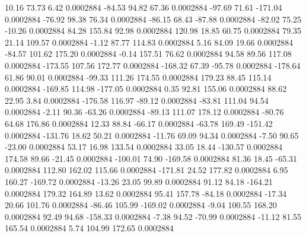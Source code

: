        10.16       73.73        6.42     0.0002884
      -84.53       94.82       67.36     0.0002884
      -97.69       71.61     -171.04     0.0002884
      -76.92       98.38       76.34     0.0002884
      -86.15       68.43      -87.88     0.0002884
      -82.02       75.25      -10.26     0.0002884
       84.28      155.84       92.98     0.0002884
      120.98       18.85       60.75     0.0002884
       79.35       21.14      109.57     0.0002884
       -1.12       87.77      114.83     0.0002884
        5.16       84.09       19.66     0.0002884
      -84.57      101.62      175.20     0.0002884
       -0.14      157.51       76.62     0.0002884
       94.58       89.56      117.08     0.0002884
     -173.55      107.56      172.77     0.0002884
     -168.32       67.39      -95.78     0.0002884
     -178.64       61.86       90.01     0.0002884
      -99.33      111.26      174.55     0.0002884
      179.23       88.45      115.14     0.0002884
     -169.85      114.98     -177.05     0.0002884
        0.35       92.81      155.06     0.0002884
       88.62       22.95        3.84     0.0002884
     -176.58      116.97      -89.12     0.0002884
      -83.81      111.04       94.54     0.0002884
       -2.11       90.36      -63.26     0.0002884
      -89.13      111.07      178.12     0.0002884
      -80.76       64.68      176.86     0.0002884
       12.33       88.84      -66.17     0.0002884
      -63.78      169.49     -151.42     0.0002884
     -131.76       18.62       50.21     0.0002884
      -11.76       69.09       94.34     0.0002884
       -7.50       90.65      -23.00     0.0002884
       53.17       16.98      133.54     0.0002884
       33.05       18.44     -130.57     0.0002884
      174.58       89.66      -21.45     0.0002884
     -100.01       74.90     -169.58     0.0002884
       81.36       18.45      -65.31     0.0002884
      112.80      162.02      115.66     0.0002884
     -171.81       24.52      177.82     0.0002884
        6.95      160.27     -169.72     0.0002884
      -13.26       23.05       99.89     0.0002884
       91.12       84.18     -164.21     0.0002884
      179.32      164.89       13.62     0.0002884
       95.41      157.78      -84.18     0.0002884
      -17.34       20.66      101.76     0.0002884
      -86.46      105.99     -169.02     0.0002884
       -9.04      100.55      168.20     0.0002884
       92.49       94.68     -158.33     0.0002884
       -7.38       94.52      -70.99     0.0002884
      -11.12       81.55      165.54     0.0002884
        5.74      104.99      172.65     0.0002884
